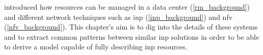  introduced how resources can be managed in a data center (\autoref{rm_background}) and different network techniques such as \gls{inp} (\autoref{inp_background}) and \gls{nfv} (\autoref{nfv_background}).
This chapter's aim is to dig into the details of these systems and to extract common patterns between similar \gls{inp} solutions in order to be able to derive a model capable of fully describing \gls{inp} resources.